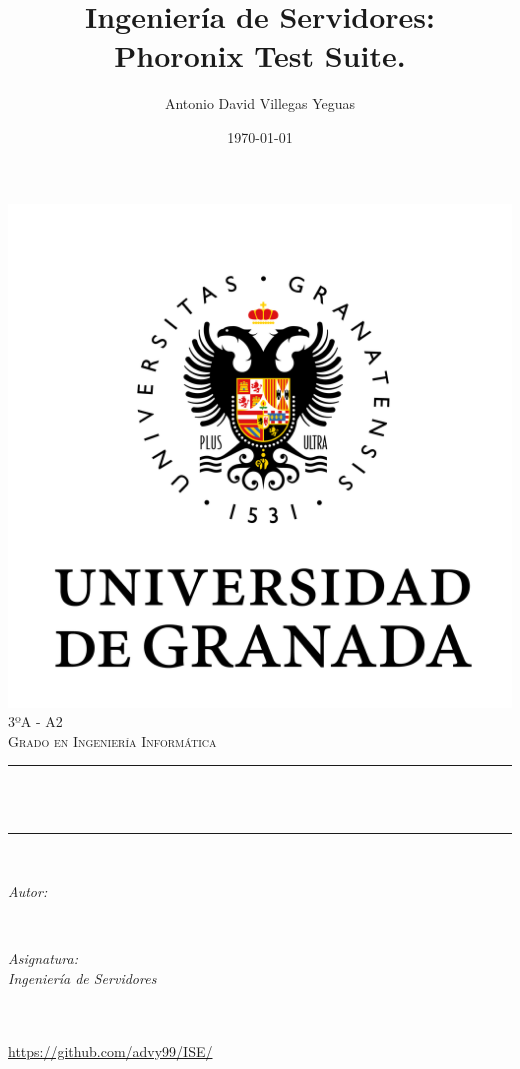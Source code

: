 \documentclass[12pt, spanish]{article}
\title{Ingeniería de Servidores:\\
Phoronix Test Suite. \hspace{0.05cm} }
\author{Antonio David Villegas Yeguas}
\date{\today}
\makeatletter
\let\thetitle\@title
\let\theauthor\@author
\let\thedate\@date
\makeatother
\begin{document}

\begin{titlepage}
    \centering
    \vspace*{0.5 cm}
    \includegraphics[scale = 0.50]{ugr.png}\\[1.0 cm]
    \textsc{\large 3ºA - A2}\\[0.5 cm]            
    \textsc{\large Grado en Ingeniería Informática}\\[0.5 cm]              
    \rule{\linewidth}{0.2 mm} \\[0.2 cm]
    { \huge \bfseries \thetitle}\\
    \rule{\linewidth}{0.2 mm} \\[1 cm]
    
    \begin{minipage}{0.4\textwidth}
        \begin{flushleft} \large
            \emph{Autor:}\\
            \theauthor
            \end{flushleft}
            \end{minipage}~
            \begin{minipage}{0.4\textwidth}
            \begin{flushright} \large
            \emph{Asignatura: \\
            Ingeniería de Servidores}                   
        \end{flushright}
    \end{minipage}\\[0.5cm]
  
    {\large \thedate}\\[0.5cm]
    {\url{https://github.com/advy99/ISE/}}
    {\doclicenseThis}
 	
    \vfill
    
\end{titlepage}
\end{document}
